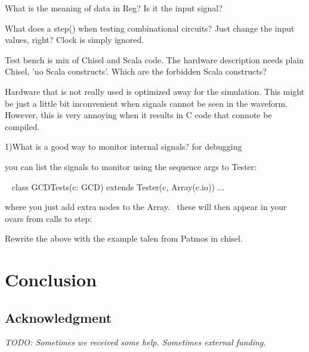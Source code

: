 \documentclass[a4paper, conference]{IEEEtran}
\newcommand{\todo}[1]{{\emph{TODO: #1}}}
\begin{document}
What is the meaning of data in Reg? Is it the input signal?

What does a step() when testing combinational circuits? Just change the input values, right? Clock is simply ignored.

Test bench is mix of Chisel and Scala code. The hardware description needs plain Chisel, 'no Scala constructs'. Which are the forbidden Scala constructs?

Hardware that is not really used is optimized away for the simulation.
This might be just a little bit inconvenient when signals cannot be seen in
the waveform. However, this is very annoying when it results in C code
that connote be compiled.

1)What is a good way to monitor internal signals? for debugging

you can list the signals to monitor using the sequence args to Tester:

  class GCDTests(c: GCD) extends Tester(c, Array(c.io)) ...

where you just add extra nodes to the Array.  these will then appear in your ovars from calls to step:

Rewrite the above with the example talen from Patmos in chisel.

\section{Conclusion}
\label{sec:conclusion}


\subsection*{Acknowledgment}

\todo{Sometimes we received some help. Sometimes external funding.}




%


\end{document}
